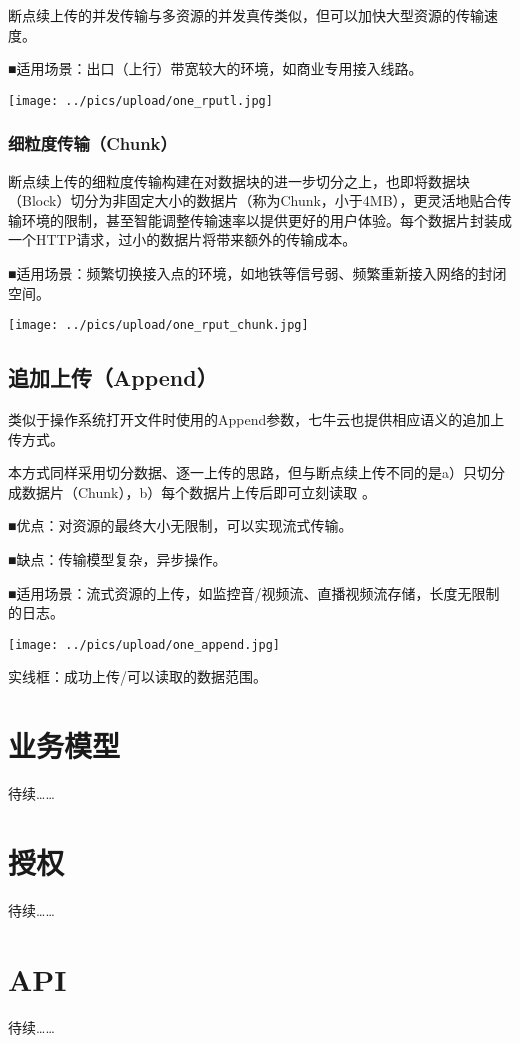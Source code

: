 \documentclass[11pt, oneside]{book}
\newcommand{\qpara}[1]{
\vspace{0.3em}
\noindent
#1\par
\vspace{0.3em}
}
\begin{document}
\qpara{断点续上传的并发传输与多资源的并发真传类似，但可以加快大型资源的传输速度。}
\qpara{■\thinspace 适用场景：出口（上行）带宽较大的环境，如商业专用接入线路。}

\texttt{[image: ../pics/upload/one\_rputl.jpg]}

\subsection{细粒度传输（Chunk）}

\qpara{断点续上传的细粒度传输构建在对数据块的进一步切分之上，也即将数据块（Block）切分为非固定大小的数据片（称为Chunk，小于4MB），更灵活地贴合传输环境的限制，甚至智能调整传输速率以提供更好的用户体验。每个数据片封装成一个HTTP请求，过小的数据片将带来额外的传输成本。}
\qpara{■\thinspace 适用场景：频繁切换接入点的环境，如地铁等信号弱、频繁重新接入网络的封闭空间。}

\texttt{[image: ../pics/upload/one\_rput\_chunk.jpg]}

\section{追加上传（Append）}

\qpara{类似于操作系统打开文件时使用的Append参数，七牛云也提供相应语义的追加上传方式。}
\qpara{本方式同样采用切分数据、逐一上传的思路，但与断点续上传不同的是a）只切分成数据片（Chunk），b）每个数据片上传后即可立刻读取 。}
\qpara{■\thinspace 优点：对资源的最终大小无限制，可以实现流式传输。}
\qpara{■\thinspace 缺点：传输模型复杂，异步操作。}
\qpara{■\thinspace 适用场景：流式资源的上传，如监控音/视频流、直播视频流存储，长度无限制的日志。}

\texttt{[image: ../pics/upload/one\_append.jpg]}

\qpara{实线框：成功上传/可以读取的数据范围。}

\chapter{业务模型}

\qpara{待续……}

\chapter{授权}

\qpara{待续……}

\chapter{API}

\qpara{待续……}
\end{document}
